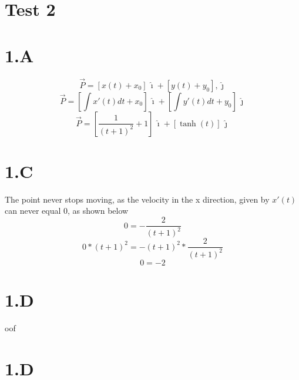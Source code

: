 \documentclass{article}
\newcommand{\ihat}{\mathbf {\hat \imath}}
\newcommand{\jhat}{\mathbf {\hat \jmath}}
\begin{document}
\section*{Test 2}
\section*{1.A}
$$ \vec{P} = [x(t)+x_0]\, \ihat + [y(t)+y_0], \jhat $$
$$ \vec{P} = [\int x'(t)dt +x_0] \, \ihat + [\int y'(t)dt +y_0] \, \jhat $$
$$ \vec{P} = [\frac{1}{(t+1)^2} +1] \, \ihat + [\tanh(t)] \, \jhat $$
\section*{1.C}
The point never stops moving, as the velocity in the x direction, given by $x'(t)$ can never equal 0, as shown below
$$0=- \frac{2}{(t+1)^2} $$
$$0*(t+1)^2 = - (t+1)^2* \frac{2}{(t+1)^2} $$
$$0 = -2 $$

\section*{1.D}
oof
\section*{1.D}
\end{document}
